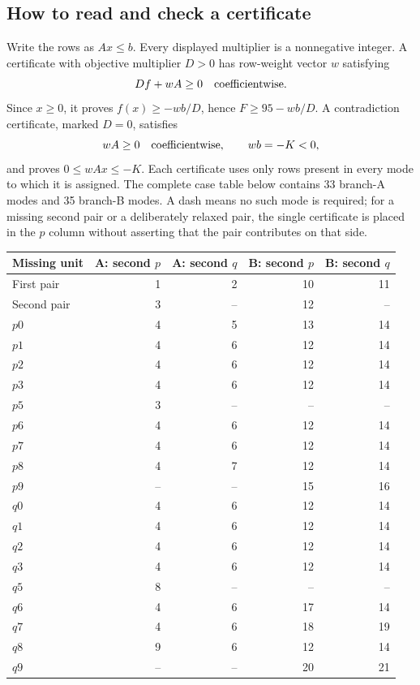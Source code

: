 \documentclass[11pt,a4paper]{article}
\theoremstyle{remark}
\begin{document}
\subsection{How to read and check a certificate}
Write the rows as $Ax\leq b$. Every displayed multiplier is a nonnegative
integer. A certificate with objective multiplier $D>0$ has row-weight
vector $w$ satisfying
\[
 Df+wA\geq0\quad\hbox{coefficientwise}.
\]
Since $x\geq0$, it proves $f(x)\geq-wb/D$, hence $F\geq95-wb/D$.
A contradiction certificate, marked $D=0$, satisfies
\[
 wA\geq0\quad\hbox{coefficientwise},\qquad wb=-K<0,
\]
and proves $0\leq wAx\leq-K$. Each certificate uses only rows present in
every mode to which it is assigned. The complete case table below contains
33 branch-A modes and 35 branch-B modes. A dash means no such mode is
required; for a missing second pair or a deliberately relaxed pair, the
single certificate is placed in the $p$ column without asserting that
the pair contributes on that side.
\begin{center}\small
\begin{tabular}{lrrrr}
\toprule
Missing unit&A: second $p$&A: second $q$&B: second $p$&B: second $q$\\
\midrule
First pair&1&2&10&11\\
Second pair&3&--&12&--\\
$p0$&4&5&13&14\\
$p1$&4&6&12&14\\
$p2$&4&6&12&14\\
$p3$&4&6&12&14\\
$p5$&3&--&--&--\\
$p6$&4&6&12&14\\
$p7$&4&6&12&14\\
$p8$&4&7&12&14\\
$p9$&--&--&15&16\\
$q0$&4&6&12&14\\
$q1$&4&6&12&14\\
$q2$&4&6&12&14\\
$q3$&4&6&12&14\\
$q5$&8&--&--&--\\
$q6$&4&6&17&14\\
$q7$&4&6&18&19\\
$q8$&9&6&12&14\\
$q9$&--&--&20&21\\
\bottomrule
\end{tabular}
\end{center}
\end{document}
